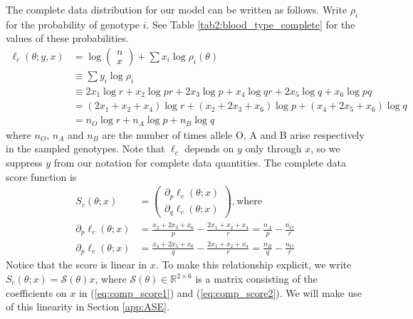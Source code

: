 \documentclass[11pt, oneside]{article}   	%
\newcommand{\bR}{\mathbb{R}}
\begin{document}
\begin{appendices}
    The complete data distribution for our model can be written as follows. Write $\rho_i$ for the probability of genotype $i$. See Table \ref{tab2:blood_type_complete} for the values of these probabilities.
    \begin{align}
        \ell_c(\theta; y,x) &= \log \begin{pmatrix} n \\ x \end{pmatrix} + \sum x_i \log \rho_i(\theta)\\
        & \equiv \sum y_i \log \rho_i\\
        &\equiv 2 x_1 \log r + x_2 \log pr + 2 x_3 \log p + x_4 \log qr + 2 x_5 \log q + x_6 \log pq\\
        &= (2 x_1 + x_2 + x_4) \log r + (x_2 + 2 x_3 + x_6) \log p + (x_4 + 2 x_5 + x_6) \log q\\
        &= n_O \log r + n_A \log p + n_B \log q
    \end{align}
    where $n_O$, $n_A$ and $n_B$ are the number of times allele O, A and B arise respectively in the sampled genotypes. Note that $\ell_c$ depends on $y$ only through $x$, so we suppress $y$ from our notation for complete data quantities. The complete data score function is
    \begin{align}
        S_c(\theta; x) &= \begin{pmatrix}
            \partial_p \ell_c(\theta; x)\\
            \partial_q \ell_c(\theta; x) 
        \end{pmatrix} \mathrm{, where}\\
        \partial_p \ell_c(\theta; x) &= \frac{x_2 + 2 x_3 + x_6}{p} - \frac{2x_1 + x_2 + x_4}{r} = \frac{n_A}{p} - \frac{n_O}{r} \label{eq:comp_score1}\\
        \partial_p \ell_c(\theta; x) &= \frac{x_4 + 2 x_5 + x_6}{q} - \frac{2x_1 + x_2 + x_4}{r} = \frac{n_B}{q} - \frac{n_O}{r} \label{eq:comp_score2}
    \end{align}
    Notice that the score is linear in $x$. To make this relationship explicit, we write $S_c(\theta; x) = \mathscr{S}(\theta) x$, where $\mathscr{S}(\theta) \in \bR^{2 \times 6}$ is a matrix consisting of the coefficients on $x$ in (\ref{eq:comp_score1}) and (\ref{eq:comp_score2}). We will make use of this linearity in Section \ref{app:ASE}.


\end{appendices}
\end{document}
